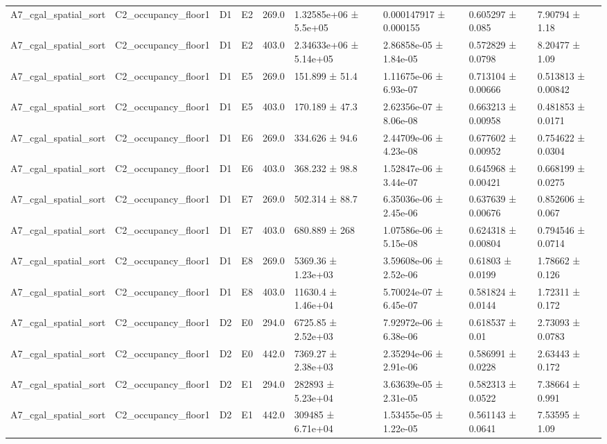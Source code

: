 \begin{table}
\begin{tabular}{lllllllll}
A7\_cgal\_spatial\_sort & C2\_occupancy\_floor1 & D1 & E2 & 269.0 & 1.32585e+06 ± 5.5e+05 & 0.000147917 ± 0.000155 & 0.605297 ± 0.085 & 7.90794 ± 1.18 \\
A7\_cgal\_spatial\_sort & C2\_occupancy\_floor1 & D1 & E2 & 403.0 & 2.34633e+06 ± 5.14e+05 & 2.86858e-05 ± 1.84e-05 & 0.572829 ± 0.0798 & 8.20477 ± 1.09 \\
A7\_cgal\_spatial\_sort & C2\_occupancy\_floor1 & D1 & E5 & 269.0 & 151.899 ± 51.4 & 1.11675e-06 ± 6.93e-07 & 0.713104 ± 0.00666 & 0.513813 ± 0.00842 \\
A7\_cgal\_spatial\_sort & C2\_occupancy\_floor1 & D1 & E5 & 403.0 & 170.189 ± 47.3 & 2.62356e-07 ± 8.06e-08 & 0.663213 ± 0.00958 & 0.481853 ± 0.0171 \\
A7\_cgal\_spatial\_sort & C2\_occupancy\_floor1 & D1 & E6 & 269.0 & 334.626 ± 94.6 & 2.44709e-06 ± 4.23e-08 & 0.677602 ± 0.00952 & 0.754622 ± 0.0304 \\
A7\_cgal\_spatial\_sort & C2\_occupancy\_floor1 & D1 & E6 & 403.0 & 368.232 ± 98.8 & 1.52847e-06 ± 3.44e-07 & 0.645968 ± 0.00421 & 0.668199 ± 0.0275 \\
A7\_cgal\_spatial\_sort & C2\_occupancy\_floor1 & D1 & E7 & 269.0 & 502.314 ± 88.7 & 6.35036e-06 ± 2.45e-06 & 0.637639 ± 0.00676 & 0.852606 ± 0.067 \\
A7\_cgal\_spatial\_sort & C2\_occupancy\_floor1 & D1 & E7 & 403.0 & 680.889 ± 268 & 1.07586e-06 ± 5.15e-08 & 0.624318 ± 0.00804 & 0.794546 ± 0.0714 \\
A7\_cgal\_spatial\_sort & C2\_occupancy\_floor1 & D1 & E8 & 269.0 & 5369.36 ± 1.23e+03 & 3.59608e-06 ± 2.52e-06 & 0.61803 ± 0.0199 & 1.78662 ± 0.126 \\
A7\_cgal\_spatial\_sort & C2\_occupancy\_floor1 & D1 & E8 & 403.0 & 11630.4 ± 1.46e+04 & 5.70024e-07 ± 6.45e-07 & 0.581824 ± 0.0144 & 1.72311 ± 0.172 \\
A7\_cgal\_spatial\_sort & C2\_occupancy\_floor1 & D2 & E0 & 294.0 & 6725.85 ± 2.52e+03 & 7.92972e-06 ± 6.38e-06 & 0.618537 ± 0.01 & 2.73093 ± 0.0783 \\
A7\_cgal\_spatial\_sort & C2\_occupancy\_floor1 & D2 & E0 & 442.0 & 7369.27 ± 2.38e+03 & 2.35294e-06 ± 2.91e-06 & 0.586991 ± 0.0228 & 2.63443 ± 0.172 \\
A7\_cgal\_spatial\_sort & C2\_occupancy\_floor1 & D2 & E1 & 294.0 & 282893 ± 5.23e+04 & 3.63639e-05 ± 2.31e-05 & 0.582313 ± 0.0522 & 7.38664 ± 0.991 \\
A7\_cgal\_spatial\_sort & C2\_occupancy\_floor1 & D2 & E1 & 442.0 & 309485 ± 6.71e+04 & 1.53455e-05 ± 1.22e-05 & 0.561143 ± 0.0641 & 7.53595 ± 1.09 \\

\end{tabular}
\end{table}
